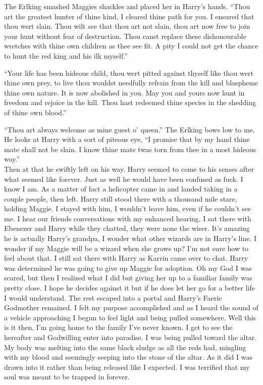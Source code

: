 	The Erlking smashed Maggies shackles and placed her in Harry's hands. ``Thou art the greatest hunter of thine kind, I cleared thine path for you. I ensured that thou wert slain. Thou wilt see that thou art not slain, thou art now free to join your hunt without fear of destruction. Thou canst replace these dishonourable wretches with thine own children as thee see fit. A pity I could not get the chance to hunt the red king and his ilk myself.''
	
	``Your life has been hideous child, thou wert pitted against thyself like thou wert thine own prey, to live thou wouldst needfully refrain from the kill and blaspheme thine own nature. It is now abolished in you. May you and yours now hunt in freedom and rejoice in the kill. Thou hast redeemed thine species in the shedding of thine own blood.''
	
	``Thou art always welcome as mine guest o' queen.'' The Erlking bows low to me. He looks at Harry with a sort of piteous eye, ``I promise that by my hand thine mate shall not be slain. I know thine mate twas torn from thee in a most hideous way.''\\

Then at that he swiftly left on his way. Harry seemed to come to his senses after what seemed like forever. Just as well he would have been confused as fuck. I know I am.  As a matter of fact a helicopter came in and landed taking in a couple people, then left. Harry still stood there with a thousand mile stare, holding Maggie. I stayed with him, I wouldn't leave him, even if he couldn't see me. I hear our friends conversations with my enhanced hearing. I sat there with Ebenezer and Harry while they chatted, they were none the wiser. It's amazing he is actually Harry's grandpa, I wonder what other wizards are in Harry's line. I wonder if my Maggie will be a wizard when she grows up? I'm not sure how to feel about that. I still sat there with Harry as Karrin came over to chat. Harry was determined he was going to give up Maggie for adoption. Oh my God I was scared, but then I realized what I did but giving her up to a familiar family was pretty close. I hope he decides against it but if he does let her go for a better life I would understand. The rest escaped into a portal and Harry's Faerie Godmother remained. I felt my purpose accomplished and as I heard the sound of a vehicle approaching I begun to feel light and being pulled somewhere. Well this is it then, I'm going home to the family I've never known. I get to see the hereafter and Godwilling enter into paradise. I was being pulled toward the altar. My body was melting into the same black sludge as all the reds had, mingling with my blood and seemingly seeping into the stone of the altar. As it did I was drawn into it rather than being released like I expected. I was terrified that my soul was meant to be trapped in \chichenitza forever.\\


